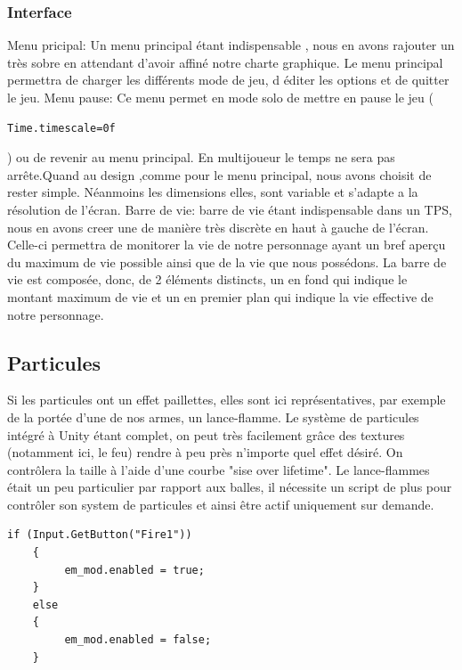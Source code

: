 ﻿\documentclass{article}
\begin{document}
\subsubsection{Interface}
Menu pricipal:
\newline Un menu principal étant indispensable , nous en avons rajouter un très sobre en attendant d'avoir
affiné notre charte graphique. Le menu principal permettra de charger les différents mode de jeu, d éditer les options
et de quitter le jeu.
\newline\newline Menu pause:
\newline Ce menu permet en mode solo de mettre en pause le jeu (\begin {verbatim}Time.timescale=0f
\end{verbatim}) ou de revenir au menu principal. En multijoueur le temps ne sera pas arrête.Quand au 
design ,comme pour le menu principal, nous avons choisit de rester simple. Néanmoins les dimensions
elles, sont variable et s'adapte a la résolution de l'écran.
\newline\newlineBarre Barre de vie:  
\newlineUne barre de vie étant indispensable dans un TPS, nous en avons creer une de manière très discrète en haut à gauche de l'écran.
Celle-ci permettra de monitorer la vie de notre personnage ayant un bref aperçu du maximum de vie possible ainsi que de la vie que nous possédons.
La barre de vie est composée, donc, de 2 éléments distincts, un en fond qui indique le montant maximum de vie et un en premier plan qui indique la vie effective de notre personnage.

\subsection {Particules}
Si les particules ont un effet paillettes, elles sont ici représentatives, 
par exemple de la portée d'une de nos armes, un lance-flamme. Le système de 
particules intégré à Unity étant complet, on peut très facilement grâce des 
textures (notamment ici, le feu) rendre à peu près n'importe quel effet désiré. 
On contrôlera la taille à l'aide d'une courbe "sise over lifetime". Le lance-flammes 
était un peu particulier par rapport aux balles, il nécessite un script de plus 
pour contrôler son system de particules et ainsi être actif uniquement sur demande.

\begin{verbatim}
if (Input.GetButton("Fire1"))
    {
         em_mod.enabled = true;
    }
    else
    {
         em_mod.enabled = false;
    }
\end{verbatim}
\end{document}

